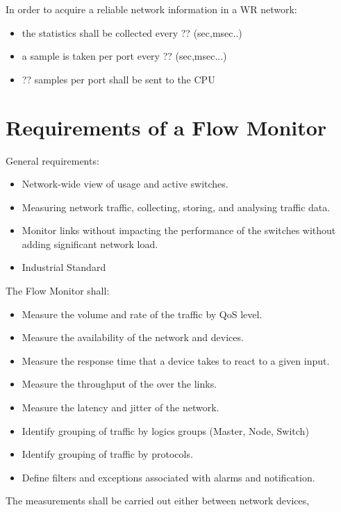 In order to acquire a reliable network information in a WR network:

\begin{itemize}
	\item the statistics shall be collected every ?? (sec,msec..)
	\item a sample is taken per port every ?? (sec,msec...)
	\item ?? samples per port shall be sent to the CPU

\end{itemize}


\section{Requirements of a Flow Monitor}

General requirements:
\begin{itemize}
	\item Network-wide view of usage and active switches. 
	\item Measuring network traffic, collecting, storing, and analysing
traffic data.
	\item Monitor links without impacting the performance of the switches
without adding significant network load.
	\item Industrial Standard
\end{itemize}

\noindent The Flow Monitor shall: 

\begin{itemize}
	\item Measure the volume and rate of the traffic by QoS level.
	\item Measure the availability of the network and devices.
	\item Measure the response time that a device takes to react to a given
input.
	\item Measure the throughput of the over the links.
	\item Measure the latency and jitter of the network.	
	\item Identify grouping of traffic by logics groups (Master, Node,
Switch)
	\item Identify grouping of traffic by protocols.
	\item Define filters and exceptions associated with alarms and
notification.
\end{itemize} 


\noindent The measurements shall be carried out either between network devices,

